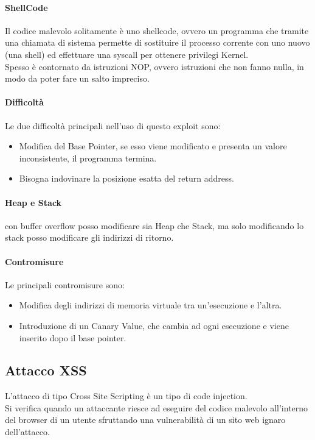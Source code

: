 \documentclass[12pt, a4paper, openany]{book}
\begin{document}
\paragraph*{ShellCode} 
Il codice malevolo solitamente è uno shellcode, ovvero un programma che tramite una chiamata di sistema permette di sostituire il processo corrente con uno nuovo (una shell) ed effettuare una syscall per ottenere privilegi Kernel.
\\Spesso è contornato da istruzioni NOP, ovvero istruzioni che non fanno nulla, in modo da poter fare un salto impreciso.

\paragraph*{Difficoltà} Le due difficoltà principali nell'uso di questo exploit sono:
\begin{itemize}
    \item Modifica del Base Pointer, se esso viene modificato e presenta un valore inconsistente, il programma termina.
    \item Bisogna indovinare la posizione esatta del return address.
\end{itemize}
\paragraph*{Heap e Stack} con buffer overflow posso modificare sia Heap che Stack, ma solo modificando lo stack posso modificare gli indirizzi di ritorno. 
\paragraph*{Contromisure}
Le principali contromisure sono:
\begin{itemize}
    \item Modifica degli indirizzi di memoria virtuale tra un'esecuzione e l'altra.
    \item Introduzione di un Canary Value, che cambia ad ogni esecuzione e viene inserito dopo il base pointer.
\end{itemize}

\subsection{Attacco XSS}
L'attacco di tipo Cross Site Scripting è un tipo di code injection.
\\Si verifica quando un attaccante riesce ad eseguire del codice malevolo all'interno del browser di un utente sfruttando una vulnerabilità di un sito web ignaro dell'attacco.
\end{document}
